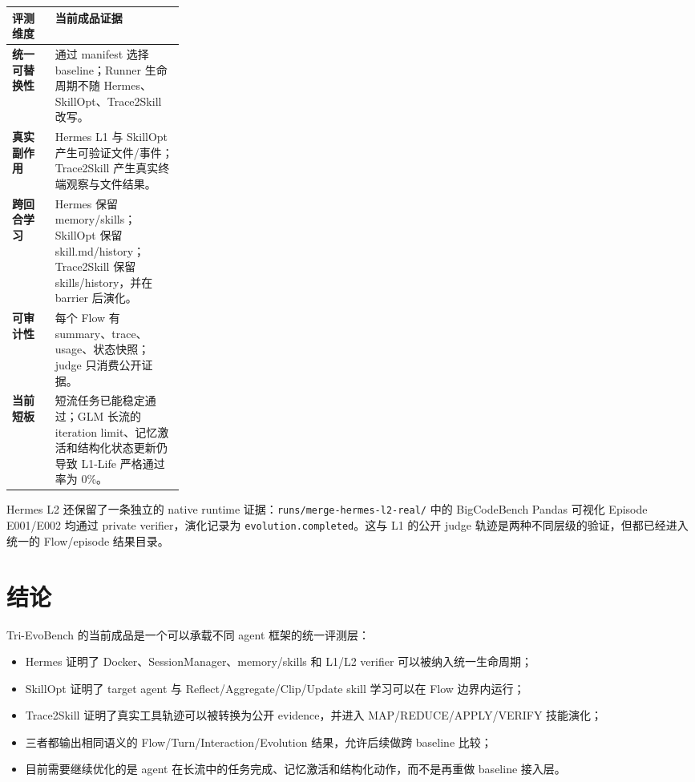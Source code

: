 \documentclass[11pt,a4paper]{article}
\newcommand{\code}[1]{\texttt{#1}}
\begin{document}
\begin{center}
\renewcommand{\arraystretch}{1.3}
\begin{tabularx}{0.98\linewidth}{>{\bfseries}p{0.25\linewidth}X}
\toprule
评测维度 & 当前成品证据 \\
\midrule
统一可替换性 & 通过 manifest 选择 baseline；Runner 生命周期不随 Hermes、SkillOpt、Trace2Skill 改写。 \\
真实副作用 & Hermes L1 与 SkillOpt 产生可验证文件/事件；Trace2Skill 产生真实终端观察与文件结果。 \\
跨回合学习 & Hermes 保留 memory/skills；SkillOpt 保留 skill.md/history；Trace2Skill 保留 skills/history，并在 barrier 后演化。 \\
可审计性 & 每个 Flow 有 summary、trace、usage、状态快照；judge 只消费公开证据。 \\
当前短板 & 短流任务已能稳定通过；GLM 长流的 iteration limit、记忆激活和结构化状态更新仍导致 L1-Life 严格通过率为 0\%。 \\
\bottomrule
\end{tabularx}
\end{center}

Hermes L2 还保留了一条独立的 native runtime 证据：\code{runs/merge-hermes-l2-real/} 中的 BigCodeBench Pandas 可视化 Episode E001/E002 均通过 private verifier，演化记录为 \code{evolution.completed}。这与 L1 的公开 judge 轨迹是两种不同层级的验证，但都已经进入统一的 Flow/episode 结果目录。

\section{结论}

Tri-EvoBench 的当前成品是一个可以承载不同 agent 框架的统一评测层：

\begin{itemize}
\item Hermes 证明了 Docker、SessionManager、memory/skills 和 L1/L2 verifier 可以被纳入统一生命周期；
\item SkillOpt 证明了 target agent 与 Reflect/Aggregate/Clip/Update skill 学习可以在 Flow 边界内运行；
\item Trace2Skill 证明了真实工具轨迹可以被转换为公开 evidence，并进入 MAP/REDUCE/APPLY/VERIFY 技能演化；
\item 三者都输出相同语义的 Flow/Turn/Interaction/Evolution 结果，允许后续做跨 baseline 比较；
\item 目前需要继续优化的是 agent 在长流中的任务完成、记忆激活和结构化动作，而不是再重做 baseline 接入层。
\end{itemize}
\end{document}
